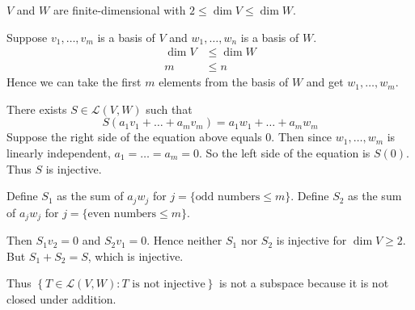 \documentclass[a5paper]{article}
\begin{document}
\newcommand    \C  { \mathbf{C} }
\newcommand    \R  { \mathbf{R} }
\renewcommand  \L  { \mathcal{L} }
\newcommand    \F  { \mathbf{F} }
\newcommand    \nullspace { \text{null\;} }
\newcommand    \range     { \text{range\;} }

$V$ and $W$ are finite-dimensional with $2 \le \dim V \le \dim W$.

Suppose $v_1,\dots,v_m$ is a basis of $V$ and $w_1,\dots,w_n$ is a basis of $W$.
\begin{align*}
    \dim V &\le \dim W  \\
         m &\le n
\end{align*}
Hence we can take the first $m$ elements from the basis of $W$ and get $w_1,\dots,w_m$.

There exists $S \in \L(V,W)$ such that
\begin{equation*}
    S(a_1v_1 + \dots + a_mv_m) = a_1w_1 + \dots + a_mw_m
\end{equation*}
Suppose the right side of the equation above equals 0.
Then since $w_1,\dots,w_m$ is linearly independent, $a_1=\dots=a_m=0$.
So the left side of the equation is $S(0)$.
Thus $S$ is injective.

Define $S_1$ as the sum of $a_jw_j$ for $j = \{\text{odd numbers}\le m\}$.
Define $S_2$ as the sum of $a_jw_j$ for $j = \{\text{even numbers}\le m\}$.

Then $S_1v_2=0$ and $S_2v_1=0$.
Hence neither $S_1$ nor $S_2$ is injective for $\dim V\ge 2$.
But $S_1+S_2=S$, which is injective.

Thus $\left\{T \in \L(V,W) : T\text{ is not injective}\right\}$ is not a subspace because it is not closed under addition.
\end{document}
